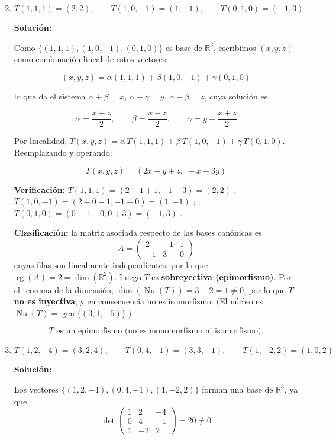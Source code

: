 \documentclass[12pt]{article}
\newcommand{\solucion}{%
    \vspace{0.8em}%
    \textbf{Solución:}%
    \vspace{0.8em}%
}
\begin{document}
\begin{enumerate}[label=\alph*.-]
    \setcounter{enumi}{1}

				\newpage
    \item
    \[
    T(1,1,1)=(2,2),\qquad T(1,0,-1)=(1,-1),\qquad T(0,1,0)=(-1,3)
    \]

    \solucion

    Como $\{(1,1,1),(1,0,-1),(0,1,0)\}$ es base de $\mathbb{R}^3$,
    escribimos $(x,y,z)$ como combinación lineal de estos vectores:

    \[
    (x,y,z)=\alpha(1,1,1)+\beta(1,0,-1)+\gamma(0,1,0)
    \]

    lo que da el sistema $\alpha+\beta=x$, $\alpha+\gamma=y$,
    $\alpha-\beta=z$, cuya solución es

    \[
    \alpha=\frac{x+z}{2},\qquad \beta=\frac{x-z}{2},\qquad \gamma=y-\frac{x+z}{2}
    \]

    Por linealidad,
    $T(x,y,z)=\alpha\,T(1,1,1)+\beta\,T(1,0,-1)+\gamma\,T(0,1,0)$.
    Reemplazando y operando:

    \[
    \boxed{T(x,y,z)=(2x-y+z,\; -x+3y)}
    \]

    \textbf{Verificación:} $T(1,1,1)=(2-1+1,-1+3)=(2,2)$ \checkmark;
    $T(1,0,-1)=(2-0-1,-1+0)=(1,-1)$ \checkmark; $T(0,1,0)=(0-1+0,0+3)=(-1,3)$ \checkmark.

    \textbf{Clasificación:} la matriz asociada respecto de las bases
    canónicas es
    \[
    A=\begin{pmatrix}2&-1&1\\-1&3&0\end{pmatrix}
    \]
    cuyas filas son linealmente independientes, por lo que
    $\operatorname{rg}(A)=2=\dim(\mathbb{R}^2)$. Luego $T$ es
    \textbf{sobreyectiva (epimorfismo)}. Por el teorema de la
    dimensión, $\dim(\operatorname{Nu}(T))=3-2=1\neq0$, por lo que $T$
    \textbf{no es inyectiva}, y en consecuencia no es isomorfismo.
    (El núcleo es $\operatorname{Nu}(T)=\operatorname{gen}\{(3,1,-5)\}$.)

    \[
    \boxed{T \text{ es un epimorfismo (no es monomorfismo ni isomorfismo).}}
    \]

				\newpage
    \item
    \[
    T(1,2,-4)=(3,2,4),\qquad T(0,4,-1)=(3,3,-1),\qquad T(1,-2,2)=(1,0,2)
    \]

    \solucion

    Los vectores $\{(1,2,-4),(0,4,-1),(1,-2,2)\}$ forman una base de
    $\mathbb{R}^3$, ya que
    \[
    \det\begin{pmatrix}1&2&-4\\0&4&-1\\1&-2&2\end{pmatrix}=20\neq0
    \]


\end{enumerate}
\end{document}
